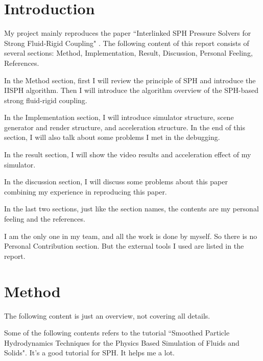 \documentclass[acmlarge]{acmart}
\begin{document}
\maketitle

\section{Introduction}

My project mainly reproduces 
the paper ``Interlinked SPH Pressure Solvers for Strong Fluid-Rigid Coupling"\cite{2019TOG} .
The following content of this report consists of several sections: Method, Implementation, Result, Discussion, 
Personal Feeling, References.

In the Method section, first I will review
the principle of SPH and introduce the IISPH algorithm.
Then
I will introduce the algorithm overview of the
SPH-based strong fluid-rigid coupling.

In the Implementation section, I will introduce simulator structure,
scene generator and render structure, and acceleration structure.
In the end of this section, I will also talk about some problems I met in the debugging.

In the result section, I will show the video results and acceleration effect of my simulator.

In the discussion section, I will discuss some problems about this paper 
combining my experience in reproducing this paper.

In the last two sections, just like the section names,
the contents are my personal feeling and the references.

I am the only one in my team, and all the work is done by myself. So there is no 
Personal Contribution section. But the external tools I used are listed in the report.

\section{Method}

The following content is just an overview, not covering all details.

Some of the following contents refers to the tutorial 
``Smoothed Particle Hydrodynamics Techniques for the Physics Based Simulation of Fluids and Solids"\cite{SPH-Intro}.
It's a good tutorial for SPH. It helps me a lot.
\end{document}
